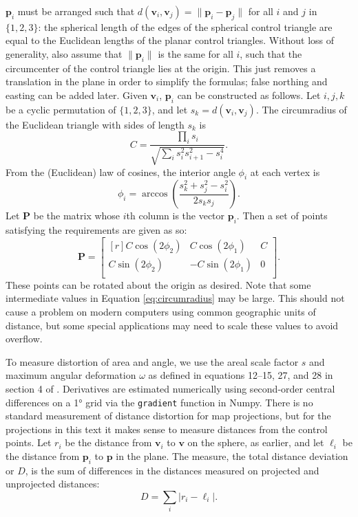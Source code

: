 \documentclass[]{interact}
\begin{document}
$\mathbf p_i$ must be arranged such that
$d\left(\mathbf v_i, \mathbf v_j\right) = \|\mathbf p_i - \mathbf p_j\|$
for all $i$ and $j$ in $\{1, 2, 3\}$: the spherical length of the edges of the
spherical control triangle are equal to the Euclidean lengths of the planar
control triangles. Without loss of generality, also assume that
$\|\mathbf p_i\|$ is the same for all $i$, such that the circumcenter of the
control triangle lies at the origin. This just removes a translation in the
plane in order to simplify the formulas; false northing and easting can be
added later. Given $\mathbf v_i$, $\mathbf p_i$ can be constructed as follows.
Let $i, j, k$ be a cyclic permutation of $\{1, 2, 3\}$, and let
$s_k = d\left(\mathbf v_i, \mathbf v_j\right)$. The circumradius
of the Euclidean triangle with sides of length $s_k$ is \citep{isaacs}
\begin{equation}\label{eq:circumradius}
  C = \frac{\prod_i s_i}{\sqrt{\sum_i s_i^2 s_{i+1}^2 - s_i^4}}.
\end{equation}
From the (Euclidean) law of cosines,
the interior angle $\phi_i$ at each vertex is
\begin{equation}\label{eq:phi}
  \phi_i = \arccos \left( \frac{s_k^2 + s_j^2 - s_i^2}{2 s_k s_j}\right).
\end{equation}
Let $\mathbf P$ be the matrix whose $i$th column is the vector $\mathbf p_i$.
Then a set of points satisfying the requirements are given as so:
\begin{equation}\label{eq:planarctrlpts}
  \mathbf P = \begin{bmatrix*}[r]
  C \cos \left(2 \phi_2 \right) &
  C \cos \left(2 \phi_1 \right) &
  C \\
  C \sin \left(2 \phi_2 \right) &
  -C \sin \left(2 \phi_1 \right) &
  0 \\
\end{bmatrix*}.
\end{equation}
These points can be rotated about the origin as desired. Note that some
intermediate values in Equation \ref{eq:circumradius} may be large. This should
not cause a problem on modern computers using common geographic units of
distance, but some special applications may need to scale these values to avoid
overflow.

To measure distortion of area and angle, we use the areal scale factor $s$ and
maximum angular deformation $\omega$ as defined in equations 12--15, 27, and 28
in section 4 of \citet{snyder87}. Derivatives are estimated numerically using
second-order central differences on a 1° grid via the \texttt{gradient}
function in Numpy. \citep{numpy} There is no standard measurement of distance
distortion for map projections, but for the projections in this text it makes
sense to measure distances from the control points. Let $r_i$ be the
distance from $\mathbf v_i$ to $\mathbf v$ on the sphere, as earlier, and let
$\ell_i$ be the distance from $\mathbf p_i$ to $\mathbf p$ in the plane.
The measure, the total distance deviation or $D$, is the sum of differences
in the distances measured on projected and unprojected distances:
\begin{equation}
 D = \sum_i \left| r_i - \ell_i \right|.
\end{equation}
\end{document}
